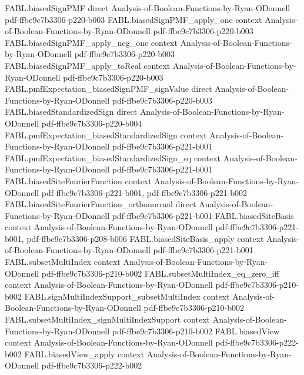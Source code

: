 \begin{theorem}
\proofstep
  {FABL.biasedSignPMF}
  {direct}
  {Analysis-of-Boolean-Functions-by-Ryan-ODonnell}
  {pdf-ffbe9c7b3306-p220-b003}
\proofstep
  {FABL.biasedSignPMF_apply_one}
  {context}
  {Analysis-of-Boolean-Functions-by-Ryan-ODonnell}
  {pdf-ffbe9c7b3306-p220-b003}
\proofstep
  {FABL.biasedSignPMF_apply_neg_one}
  {context}
  {Analysis-of-Boolean-Functions-by-Ryan-ODonnell}
  {pdf-ffbe9c7b3306-p220-b003}
\proofstep
  {FABL.biasedSignPMF_apply_toReal}
  {context}
  {Analysis-of-Boolean-Functions-by-Ryan-ODonnell}
  {pdf-ffbe9c7b3306-p220-b003}
\proofstep
  {FABL.pmfExpectation_biasedSignPMF_signValue}
  {direct}
  {Analysis-of-Boolean-Functions-by-Ryan-ODonnell}
  {pdf-ffbe9c7b3306-p220-b003}
\proofstep
  {FABL.biasedStandardizedSign}
  {direct}
  {Analysis-of-Boolean-Functions-by-Ryan-ODonnell}
  {pdf-ffbe9c7b3306-p220-b004}
\proofstep
  {FABL.pmfExpectation_biasedStandardizedSign}
  {context}
  {Analysis-of-Boolean-Functions-by-Ryan-ODonnell}
  {pdf-ffbe9c7b3306-p221-b001}
\proofstep
  {FABL.pmfExpectation_biasedStandardizedSign_sq}
  {context}
  {Analysis-of-Boolean-Functions-by-Ryan-ODonnell}
  {pdf-ffbe9c7b3306-p221-b001}
\proofstep
  {FABL.biasedSiteFourierFunction}
  {context}
  {Analysis-of-Boolean-Functions-by-Ryan-ODonnell}
  {pdf-ffbe9c7b3306-p221-b001,
    pdf-ffbe9c7b3306-p221-b002}
\proofstep
  {FABL.biasedSiteFourierFunction_orthonormal}
  {direct}
  {Analysis-of-Boolean-Functions-by-Ryan-ODonnell}
  {pdf-ffbe9c7b3306-p221-b001}
\proofstep
  {FABL.biasedSiteBasis}
  {context}
  {Analysis-of-Boolean-Functions-by-Ryan-ODonnell}
  {pdf-ffbe9c7b3306-p221-b001,
    pdf-ffbe9c7b3306-p208-b006}
\proofstep
  {FABL.biasedSiteBasis_apply}
  {context}
  {Analysis-of-Boolean-Functions-by-Ryan-ODonnell}
  {pdf-ffbe9c7b3306-p221-b001}
\proofstep
  {FABL.subsetMultiIndex}
  {context}
  {Analysis-of-Boolean-Functions-by-Ryan-ODonnell}
  {pdf-ffbe9c7b3306-p210-b002}
\proofstep
  {FABL.subsetMultiIndex_eq_zero_iff}
  {context}
  {Analysis-of-Boolean-Functions-by-Ryan-ODonnell}
  {pdf-ffbe9c7b3306-p210-b002}
\proofstep
  {FABL.signMultiIndexSupport_subsetMultiIndex}
  {context}
  {Analysis-of-Boolean-Functions-by-Ryan-ODonnell}
  {pdf-ffbe9c7b3306-p210-b002}
\proofstep
  {FABL.subsetMultiIndex_signMultiIndexSupport}
  {context}
  {Analysis-of-Boolean-Functions-by-Ryan-ODonnell}
  {pdf-ffbe9c7b3306-p210-b002}
\proofstep
  {FABL.biasedView}
  {context}
  {Analysis-of-Boolean-Functions-by-Ryan-ODonnell}
  {pdf-ffbe9c7b3306-p222-b002}
\proofstep
  {FABL.biasedView_apply}
  {context}
  {Analysis-of-Boolean-Functions-by-Ryan-ODonnell}
  {pdf-ffbe9c7b3306-p222-b002}

\end{theorem}
